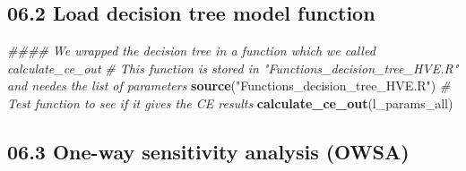 \documentclass[
]{article}
\newenvironment{Shaded}{\begin{snugshade}}{\end{snugshade}}
\newcommand{\CommentTok}[1]{\textcolor[rgb]{0.56,0.35,0.01}{\textit{#1}}}
\newcommand{\KeywordTok}[1]{\textcolor[rgb]{0.13,0.29,0.53}{\textbf{#1}}}
\newcommand{\NormalTok}[1]{#1}
\newcommand{\StringTok}[1]{\textcolor[rgb]{0.31,0.60,0.02}{#1}}
\begin{document}
\hypertarget{load-decision-tree-model-function}{%
\subsection{06.2 Load decision tree model
function}\label{load-decision-tree-model-function}}

\begin{Shaded}
\begin{Highlighting}[]
\CommentTok{#### We wrapped the decision tree in a function which we called calculate_ce_out }
\CommentTok{# This function is stored in "Functions_decision_tree_HVE.R" and needes the list of parameters}
\KeywordTok{source}\NormalTok{(}\StringTok{"Functions_decision_tree_HVE.R"}\NormalTok{)}
\CommentTok{# Test function to see if it gives the CE results}
\KeywordTok{calculate_ce_out}\NormalTok{(l_params_all)}
\end{Highlighting}
\end{Shaded}

\hypertarget{one-way-sensitivity-analysis-owsa}{%
\subsection{06.3 One-way sensitivity analysis
(OWSA)}\label{one-way-sensitivity-analysis-owsa}}
\end{document}
